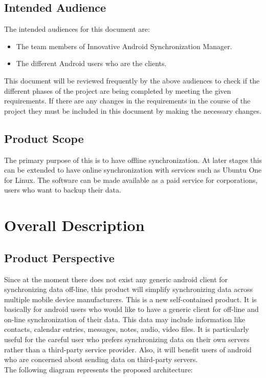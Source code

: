 \subsection{Intended Audience}
The intended audiences for this document are:
\begin{itemize}
 \item The team members of Innovative Android Synchronization Manager.
 \item The different Android users who are the clients.
\end{itemize}

This document will be reviewed frequently by the above audiences to check if the different
phases of the project are being completed by meeting the given requirements. If there are any changes
in the requirements in the course of the project they must be included in this document by making the
necessary changes.
\subsection{Product Scope}
\hspace*{0.82cm}The primary purpose of this is to have offline synchronization. At later stages this can be
extended to have online synchronization with services such as Ubuntu One for Linux. The software
can be made available as a paid service for corporations, users who want to backup their data.
\newpage
\section{Overall Description}
\subsection{Product Perspective}
\hspace*{0.82cm}Since at the moment there does not exist any generic android client for synchronizing data
off-line, this product will simplify synchronizing data across multiple mobile device manufacturers.
This is a new self-contained product. It is basically for android users who would like to have a generic
client for off-line and on-line synchronization of their data. This data may include information like
contacts, calendar entries, messages, notes, audio, video files. It is particularly useful for the careful
user who prefers synchronizing data on their own servers rather than a third-party service provider.
Also, it will benefit users of android who are concerned about sending data on third-party servers.\\[0.5cm]
The following diagram represents the proposed architecture:

